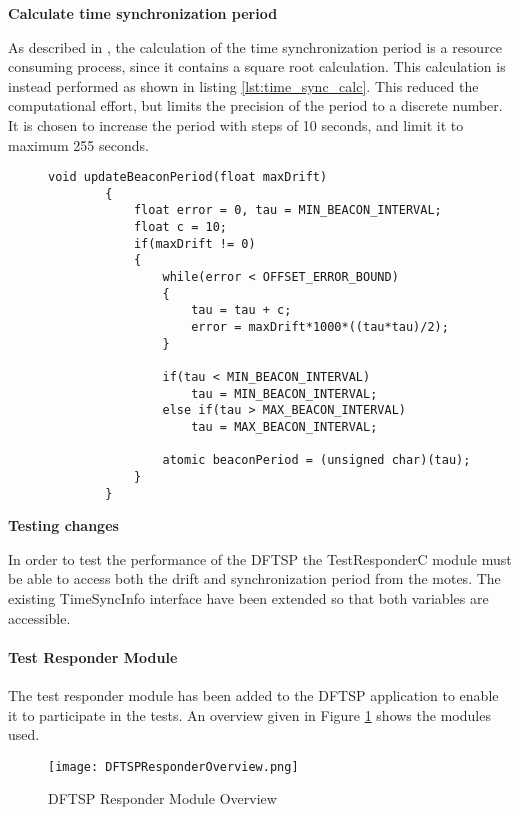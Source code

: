 \documentclass[Main]{subfiles}
\begin{document}
			    \newpage
			    \textbf{Calculate time synchronization period}

			    	As described in \cite{dynamicFTSParticle}, the calculation of the time synchronization period is a resource consuming process, since it contains a square root calculation.
			    	This calculation is instead performed as shown in listing \ref{lst:time_sync_calc}.
			    	This reduced the computational effort, but limits the precision of the period to a discrete number. 
			    	It is chosen to increase the period with steps of 10 seconds, and limit it to maximum 255 seconds.
			    	
					\begin{figure}[H]
						\begin{lstlisting}[caption=Calculate time synchronization period, style=Code-C, label=lst:time_sync_calc]
		void updateBeaconPeriod(float maxDrift)
	    {
	    	float error = 0, tau = MIN_BEACON_INTERVAL;
	    	float c = 10;
	    	if(maxDrift != 0)
	    	{
	    		while(error < OFFSET_ERROR_BOUND)
	    		{
	    			tau = tau + c;
	    			error = maxDrift*1000*((tau*tau)/2);
				}
				
				if(tau < MIN_BEACON_INTERVAL)
					tau = MIN_BEACON_INTERVAL;
				else if(tau > MAX_BEACON_INTERVAL)
					tau = MAX_BEACON_INTERVAL;
					
				atomic beaconPeriod = (unsigned char)(tau);
	    	}
	    }
			    		\end{lstlisting}
			    	\end{figure}			

				\textbf{Testing changes}

					In order to test the performance of the DFTSP the TestResponderC module must be able to access both the drift and synchronization period from the motes. 
					The existing TimeSyncInfo interface have been extended so that both variables are accessible.



			

			
			\newpage
			\paragraph{Test Responder Module} %
			\label{par:test_responder_module}
				The test responder module has been added to the DFTSP application to enable it to participate in the tests.
				An overview given in Figure \ref{fig:DFTSPResponderOverview} shows the modules used.

				\begin{figure}[H]
					\centering
					\texttt{[image: DFTSPResponderOverview.png]}
					\caption{DFTSP Responder Module Overview}
					\label{fig:DFTSPResponderOverview}
				\end{figure}
\end{document}
